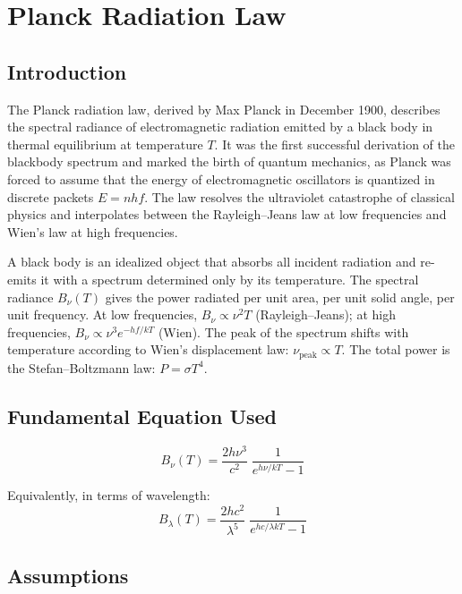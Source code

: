 \chapter{Planck Radiation Law}

\section*{Introduction}

The Planck radiation law, derived by Max Planck in December 1900, describes the spectral radiance of electromagnetic radiation emitted by a black body in thermal equilibrium at temperature $T$. It was the first successful derivation of the blackbody spectrum and marked the birth of quantum mechanics, as Planck was forced to assume that the energy of electromagnetic oscillators is quantized in discrete packets $E = nhf$. The law resolves the ultraviolet catastrophe of classical physics and interpolates between the Rayleigh--Jeans law at low frequencies and Wien's law at high frequencies.

A black body is an idealized object that absorbs all incident radiation and re-emits it with a spectrum determined only by its temperature. The spectral radiance $B_{\nu}(T)$ gives the power radiated per unit area, per unit solid angle, per unit frequency. At low frequencies, $B_{\nu} \propto \nu^{2}T$ (Rayleigh--Jeans); at high frequencies, $B_{\nu} \propto \nu^{3}e^{-hf/kT}$ (Wien). The peak of the spectrum shifts with temperature according to Wien's displacement law: $\nu_{\text{peak}} \propto T$. The total power is the Stefan--Boltzmann law: $P = \sigma T^{4}$.
\section*{Fundamental Equation Used}

\begin{equation}
\boxed{\; B_{\nu}(T) = \frac{2h\nu^{3}}{c^{2}}\;\frac{1}{e^{h\nu/kT} - 1}\;}
\label{eq:planck-radiation}
\end{equation}

Equivalently, in terms of wavelength:
\begin{equation}
B_{\lambda}(T) = \frac{2hc^{2}}{\lambda^{5}}\;\frac{1}{e^{hc/\lambda kT} - 1}
\label{eq:planck-wavelength}
\end{equation}
\section*{Assumptions}

